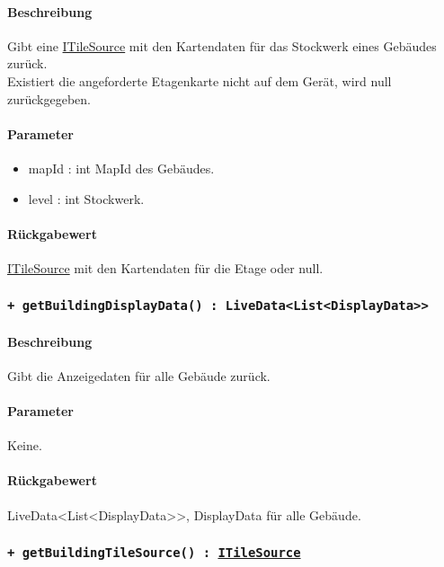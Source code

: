 \paragraph*{Beschreibung}
Gibt eine \href{https://osmdroid.github.io/osmdroid/javadocAll/org/osmdroid/tileprovider/tilesource/ITileSource.html}
{ITileSource} mit den Kartendaten für das Stockwerk eines Gebäudes zurück.\\
Existiert die angeforderte Etagenkarte nicht auf dem Gerät, wird null zurückgegeben.
\paragraph*{Parameter}
\begin{itemize}
    \item mapId : int MapId des Gebäudes.
    \item level : int Stockwerk.
\end{itemize}
\paragraph*{Rückgabewert}
\href{https://osmdroid.github.io/osmdroid/javadocAll/org/osmdroid/tileprovider/tilesource/ITileSource.html}
{ITileSource} mit den Kartendaten für die Etage oder null.

\subsubsection{\texttt{+ getBuildingDisplayData() : LiveData<List<DisplayData>>}}%
\paragraph*{Beschreibung}
Gibt die Anzeigedaten für alle Gebäude zurück.
\paragraph*{Parameter}
Keine.
\paragraph*{Rückgabewert}
LiveData<List<DisplayData>>, DisplayData für alle Gebäude.

\subsubsection{\texttt{+ getBuildingTileSource() : \href{https://osmdroid.github.io/osmdroid/javadocAll/org/osmdroid/tileprovider/tilesource/ITileSource.html}
{ITileSource}}}%

